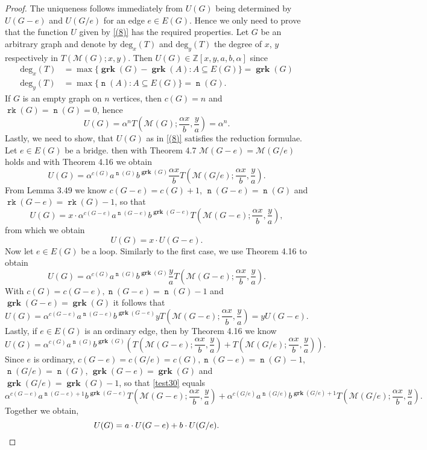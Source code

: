 \documentclass[12pt,a4paper, twoside, autooneside=false]{scrartcl}
\theoremstyle{definition}
\theoremstyle{remark}
\numberwithin{equation}{section}
\DeclareMathOperator{\rk}{\mathtt{rk}}
\DeclareMathOperator{\n}{\mathtt{n}}
\newcommand{\M}{\mathcal{M}} %
\DeclareMathOperator{\grk}{\mathbf{grk}} %
\begin{document}
\begin{proof}
The uniqueness follows immediately from $U(G)$ being determined by $U(G - e)$ and $U(G /e)$ for an edge $e \in E(G)$. Hence we only need to prove that the function $U$ given by \eqref{(8)} has the required properties. Let $G$ be an arbitrary graph and denote by $\mathrm{deg}_x(T)$ and $\mathrm{deg}_y(T)$ the degree of $x$, $y$ respectively in $T(\M(G); x,y)$. Then $U(G) \in \mathbb{Z}[x,y,a,b, \alpha]$ since
\begin{align*}
\mathrm{deg}_x(T) &= \max\{ \grk(G) - \grk(A): A \subseteq E(G)\} = \grk(G) \\ 
\mathrm{deg}_y(T) &= \max\{\n(A): A \subseteq E(G)\} = \n(G).
\end{align*}
If $G$ is an empty graph on $n$ vertices, then $c(G) = n$ and $\rk(G) = \n(G) = 0$, hence 
\[
U(G) = \alpha^n T\left(\M(G);\frac{\alpha x }{b}, \frac{y}{a}\right) = \alpha^n. 
\]
Lastly, we need to show, that $U(G)$ as in \eqref{(8)} satisfies the reduction formulae. Let $e \in E(G)$ be a bridge. then with Theorem 4.7 $\M(G - e) = \M(G / e)$ holds and with Theorem 4.16 we obtain
\begin{equation}
U(G) = \alpha^{c(G)} a^{\n(G)}b^{\grk(G)} \frac{\alpha x}{b} T\left(\M(G / e);\frac{\alpha x}{b}, \frac{y}{a}\right).
\end{equation}
From Lemma 3.49 we know $c(G - e) = c(G) + 1$, $\n(G - e) = \n(G)$ and $\rk(G - e) = \rk(G) - 1$, so that 
\[
U(G) = x \cdot \alpha^{c(G - e)} a^{\n(G - e)}b^{\grk(G - e)} T(\M(G -e);\frac{\alpha x}{b}, \frac{y}{a}), 
\]
from which we obtain 
\[
U(G) = x \cdot U(G - e).
\]
Now let $e \in E(G)$ be a loop. Similarly to the first case, we use Theorem 4.16 to obtain
\[
U(G) = \alpha^{c(G)} a^{\n(G)}b^{\grk(G)} \frac{y}{a} T\left(\M(G - e);\frac{\alpha x}{b}, \frac{y}{a}\right).
\]
With $c(G) = c(G - e), \n(G - e) = \n(G) - 1$ and $\grk(G - e) = \grk(G)$ it follows that
\[
U(G) = \alpha^{c(G - e)}a^{\n(G - e)} b^{\grk(G - e)}y  T\left(\M(G - e);\frac{\alpha x}{b}, \frac{y}{a}\right)
= y U(G - e).
\]
Lastly, if $e \in E(G)$ is an ordinary edge, then by Theorem 4.16 we know
\begin{equation} \label{test30}
U(G) = \alpha^{c(G)} a^{\n(G)}b^{\grk(G)} \left(T(\M(G -e); \frac{\alpha x}{b}, \frac{y}{a}) + T(\M(G /e); \frac{\alpha x}{b}, \frac{y}{a})\right). 
\end{equation}
Since $e$ is ordinary, $c(G - e) = c(G / e) = c(G), \n(G - e) = \n(G) - 1$, $\n(G / e) = \n(G)$, $\grk(G - e) = \grk(G)$ and $\grk(G/ e) = \grk(G) - 1$, so that \eqref{test30} equals
\[
\alpha^{c(G - e)}a^{\n(G - e) + 1}b^{\grk(G - e)} T(\M(G - e); \frac{\alpha x}{b}, \frac{y}{a}) + \alpha^{c(G/ e)}a^{\n(G / e)}b^{\grk(G / e) + 1} T(\M(G / e); \frac{\alpha x}{b}, \frac{y}{a}).
\]
Together we obtain, 
\[
U(G) = a \cdot U(G - e) + b \cdot U(G / e). \qedhere
\]
\end{proof}
\end{document}
